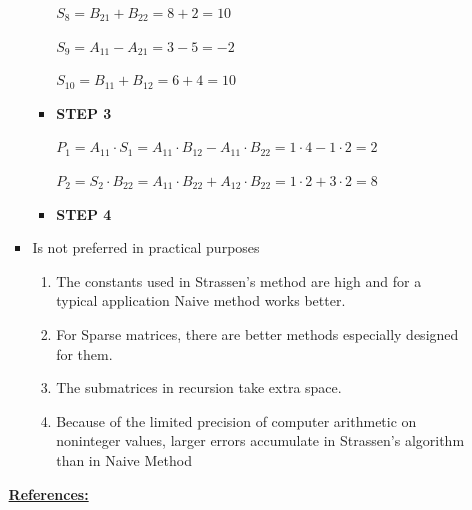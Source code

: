 \documentclass[12pt]{article}
\begin{document}
\begin{enumerate}[1.]
\begin{itemize}
\begin{itemize}
\begin{itemize}
                \bigskip

                $S_8 = B_{21} + B_{22} = 8 + 2 = 10$

                \bigskip

                $S_9 = A_{11} - A_{21} = 3 - 5 = -2$

                \bigskip

                $S_{10} = B_{11} + B_{12} = 6 + 4 = 10$

                \bigskip

                \item \textbf{STEP 3}

                \bigskip

                $P_1 = A_{11} \cdot S_1 = A_{11} \cdot B_{12} - A_{11} \cdot B_{22} = 1 \cdot 4 - 1 \cdot 2 = 2$

                \bigskip

                $P_2 = S_2 \cdot B_{22} = A_{11} \cdot B_{22} + A_{12} \cdot B_{22} = 1 \cdot 2 + 3 \cdot 2 = 8$

                \item \textbf{STEP 4}

            \end{itemize}

            \item Is not preferred in practical purposes

            \bigskip

            \begin{enumerate}[1)]
                \item The constants used in Strassen’s method are high and for a typical application Naive method works better.
                \item For Sparse matrices, there are better methods especially designed for them.
                \item The submatrices in recursion take extra space.
                \item Because of the limited precision of computer arithmetic on noninteger values, larger errors accumulate in Strassen’s algorithm than in Naive Method
            \end{enumerate}
        \end{itemize}

        \bigskip

        \underline{\textbf{References:}}

        \bigskip


\end{itemize}
\end{enumerate}
\end{document}
